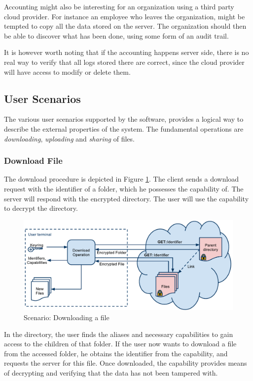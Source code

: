 \documentclass[pdftex,english,10pt,b5paper,twoside]{book}
\begin{document}
Accounting might also be interesting for an organization using a third party
cloud provider. For instance an employee who leaves the organization, might be
tempted to copy all the data stored on the server. The organization should then
be able to discover what has been done, using some form of an audit trail.

It is however worth noting that if the accounting happens server side, there is
no real way to verify that all logs stored there are correct, since the cloud
provider will have access to modify or delete them.

\subsection{User Scenarios}

The various user scenarios supported by the software, provides a logical way to
describe the external properties of the system. The fundamental operations are
\emph{downloading}, \emph{uploading} and \emph{sharing} of files.

\subsubsection{Download File}

The download procedure is depicted in Figure \ref{fig:AS:download}. The client
sends a download request with the identifier of a folder, which he possesses
the capability of. The server will respond with the encrypted directory.
The user will use the capability to decrypt the directory.

\begin{figure}[h!]
    \centering
    \includegraphics[width=\columnwidth]{ArchitectureDownload.pdf}
    \caption{Scenario: Downloading a file}
    \label{fig:AS:download}
\end{figure}

In the directory, the user finds the aliases and necessary capabilities to gain
access to the children of that folder. If the user now wants to download a file
from the accessed folder, he obtains the identifier from the capability, and
requests the server for this file. Once downloaded, the capability provides
means of decrypting and verifying that the data has not been tampered with.
\end{document}
